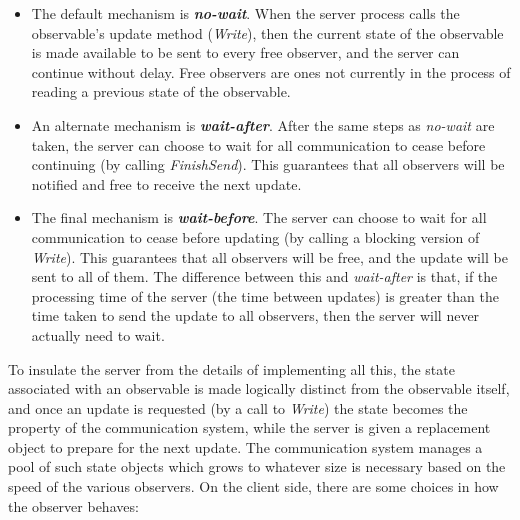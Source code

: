 \begin{itemize} \pflist

\item The default mechanism is \textbf{\textit{no-wait}}.  When the
server process calls the observable's update method ({\it Write}),
then the current state of the observable is made available to be sent
to every free observer, and the server can continue without delay.
Free observers are ones not currently in the process of reading a
previous state of the observable.

\item An alternate mechanism is \textbf{\textit{wait-after}}.  After the same 
steps as {\it no-wait} are taken, the server can choose
to wait for all communication to cease before continuing (by 
calling {\it FinishSend}).  This guarantees that all observers will
be notified and free to receive the next update.

\item The final mechanism is \textbf{\textit{wait-before}}.  The server can choose
to wait for all communication to cease before updating (by calling a
blocking version of {\it Write}).  This guarantees that all observers
will be free, and the update will be sent to all of them.  The
difference between this and {\it wait-after} is that, if the processing
time of the server (the time between updates) is greater than the time 
taken to send the update to all observers, then the server will never
actually need to wait.

\end{itemize}

\noindent
%
To insulate the server from the details of implementing all this, the
state associated with an observable is made logically distinct from
the observable itself, and once an update is requested (by a call to
{\em Write}) the state becomes the property of the communication
system, while the server is given a replacement object to prepare for
the next update.
%
The communication system manages a pool of such state objects which
grows to whatever size is necessary based on the speed of the various
observers.
%
%
On the client side, there are some choices in how the
observer behaves:

